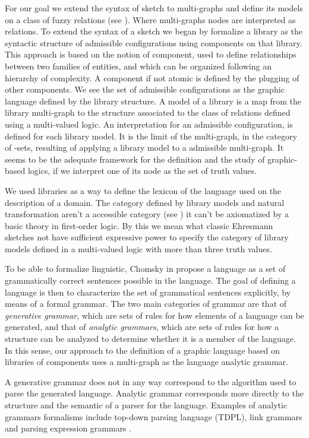 \documentclass[oribibl]{llncs}
\begin{document}
For our goal we extend the syntax of sketch to multi-graphs and
define its models on a class of fuzzy relations (see \cite{Johnstone02}). Where multi-graphs nodes are interpreted as relations. To extend the
syntax of a sketch we began by formalize a library as the syntactic
structure of admissible configurations using components on that
library. This approach is based on the notion of component, used to
define relationships between two families of entities, and which can
be organized following an hierarchy of complexity. A
component if not atomic is defined by the plugging of other
components. We see the set of admissible configurations as the
graphic language defined by the library structure. A model of a
library is a map from the library multi-graph to the structure associated to the class of relations defined using a multi-valued logic. An interpretation for an
admissible configuration, is defined for each library model. It is
the limit of the multi-graph, in the category of -sets, resulting of applying a library model to a
admissible multi-graph. It seems to be the adequate framework for the definition and the study of graphic-based logics, if we interpret one of its node as the set of truth values.

We used libraries as a way to define the lexicon of the language used on the description of a domain. The category defined by library models and natural transformation aren't a accessible category (see \cite{Adamek94}) it can't be axiomatized by a basic theory in first-order logic. By this we mean what classic Ehresmann sketches not have sufficient expressive power to specify the category of library models defined in a multi-valued logic with more than three truth values.

To be able to formalize linguistic, Chomsky in \cite{chomsky57}
propose a language as a set of grammatically correct sentences
possible in the language. The goal of defining a language is then to
characterize the set of grammatical sentences explicitly, by means
of a formal grammar. The two main categories of grammar are that of
\emph{generative grammar}, which are sets of rules for how elements
of a language can be generated, and that of \emph{analytic
grammars}, which are sets of rules for how a structure can be
analyzed to determine whether it is a member of the language. In
this sense, our approach to the definition of a graphic language
based on libraries of components uses a multi-graph as the language
analytic grammar.

A generative grammar does not in any way correspond to the algorithm
used to parse the generated language. Analytic grammar corresponds
more directly to the structure and the semantic of a parser for the
language. Examples of analytic grammars formalisms include top-down parsing language (TDPL)\cite{Birman}, link
grammars \cite{Sleator91} and parsing expression grammars \cite{Ford04}.
\end{document}
